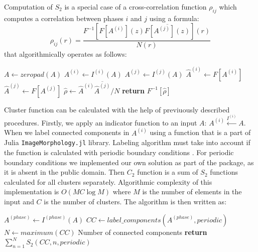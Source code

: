\documentclass[reprint,amsmath,amssymb,aps,pre,showkeys,showpacs,nofootinbib]{revtex4-1}
\newcommand{\code}[1]{\colorbox{light-gray}{\texttt{#1}}}
\begin{document}
Computation of $S_2$ is a special case of a cross-correlation function $\rho_{ij}$
which computes a correlation between phases $i$ and $j$ using a formula:
\begin{equation}
  \rho_{ij}(r) = \frac{F^{-1} [F[A^{(i)}](z) \overline{F[A^{(j)}](z)}] (r)}{N(r)} \label{eq:cross-ft}
\end{equation}
that algorithmically operates as follows:
\begin{algorithmic}[1]
    \State $A \gets zeropad(A)$
  \EndIf
  \State $A^{(i)} \gets I^{(i)} (A)$
  \State $A^{(j)} \gets I^{(j)} (A)$
  \State $\hat{A}^{(i)} \gets F[A^{(i)}]$
  \State $\hat{A}^{(j)} \gets F[A^{(j)}]$
  \State $\hat{\rho} \gets \hat{A}^{(i)} \overline{\hat{A}^{(j)}} / N$
  \State \textbf{return} $F^{-1} [\hat{\rho}]$
  \EndProcedure
\end{algorithmic}

Cluster function can be calculated with the help of previuously described procedures. 
Firstly, we apply an indicator function to an input $A$: $A^{(i)} \xleftarrow{I^{(i)}} A$. When we
label connected components in $A^{(i)}$ using a function that is a part of Julia \code{ImageMorphology.jl} library. 
Labeling algorithm must take into account if the function is calculated with periodic boundary 
conditions \cite{evstigneev2023}. For periodic boundary conditions we implemented our own solution 
as part of the package, as it is absent in the public domain. Then $C_2$
function is a sum of $S_2$ functions calculated for all clusters
separately. Algorithmic complexity of this implementation is $O(MC \log M)$
where $M$ is the number of elements in the input and $C$ is the number of
clusters. The algorithm is then written as:
\begin{algorithmic}[1]
  \State $A^{(phase)} \gets I^{(phase)} (A)$
  \State $CC \gets label\_components(A^{(phase)}, periodic)$
  \State $N \gets maximum(CC)$ \Comment Number of connected components
  \State \textbf{return} $\sum\limits_{n=1}^N S_2(CC, n, periodic)$
  \EndProcedure
\end{algorithmic}
\end{document}

